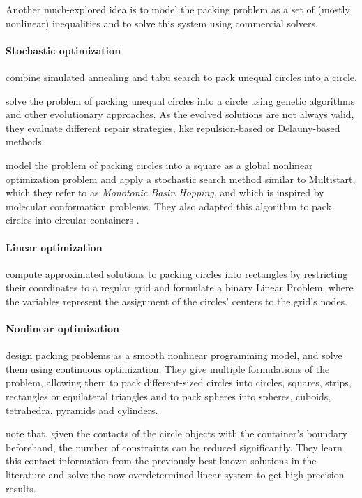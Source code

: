 \documentclass[a4paper,style=print,bibliography=totoc,nexus,lnum,extramargin]{tubsbook}
\begin{document}
Another much-explored idea is to model the packing problem as a set of (mostly nonlinear) inequalities and to solve this system using commercial solvers.

\paragraph{Stochastic optimization}

\textcite{ZD2005effective} combine simulated annealing and tabu search to pack unequal circles into a circle.

\textcite{FMC2015evolutionary} solve the problem of packing unequal circles into a circle using genetic algorithms and other evolutionary approaches. As the evolved solutions are not always valid, they evaluate different repair strategies, like repulsion-based or Delauny-based methods.

\textcite{ALS2008disk} model the problem of packing circles into a square as a global nonlinear optimization problem and apply a stochastic search method similar to Multistart, which they refer to as \emph{Monotonic Basin Hopping}, and which is inspired by molecular conformation problems. They also adapted this algorithm to pack circles into circular containers \cite{GJLS2009solving}.

\paragraph{Linear optimization}

\textcite{LIE2014approximate} compute approximated solutions to packing circles into rectangles by restricting their coordinates to a regular grid and formulate a binary Linear Problem, where the variables represent the assignment of the circles' centers to the grid's nodes.

\paragraph{Nonlinear optimization}

\textcite{BS2008minimizing} design packing problems as a smooth nonlinear programming model, and solve them using continuous optimization. They give multiple formulations of the problem, allowing them to pack different-sized circles into circles, squares, strips, rectangles or equilateral triangles and to pack spheres into spheres, cuboids, tetrahedra, pyramids and cylinders.

\textcite{BG2010new} note that, given the contacts of the circle objects with the container's boundary beforehand, the number of constraints can be reduced significantly. They learn this contact information from the previously best known solutions in the literature and solve the now overdetermined linear system to get high-precision results.
\end{document}
